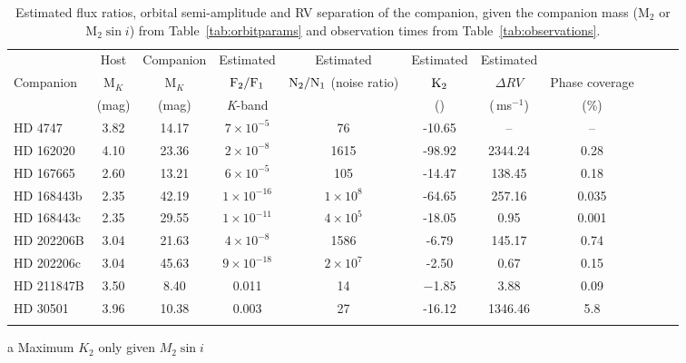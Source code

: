 \begin{table*}
    \small
    \centering
    \begin{threeparttable}[b]
        \caption{Estimated flux ratios, orbital semi-amplitude and RV separation of the companion, given the companion mass (\(\textrm{M}_{2}\) or \(\textrm{M}_{2} \sin{i}\)) from Table~\ref{tab:orbitparams} and observation times from Table~\ref{tab:observations}.}
        \begin{tabular}{l c c c c c c c c c c}%
            \toprule
            & Host & Companion & Estimated & Estimated & Estimated & Estimated & & \\  %
            Companion & M$_{K}$ & M$_{K}$ & \(\rm F_{2}/F_{1} \) & \(\rm N_{2}/N_{1} \) (noise ratio) & \(\rm K_2\) & \(\Delta RV\) & Phase coverage\\
            & (mag) & (mag)& \textit{K}-band & & (\kmps{}) & (\,ms\(^{-1}\)) & (\%)\\
            \midrule
            {HD 4747} & 3.82 & 14.17 & \(7\times10^{-5} \) & 76 & -10.65 & -- & --\\  %
            {HD 162020} & 4.10 & 23.36 & \(2\times10^{-8} \) & 1615 & -98.92\tnote{a} & 2344.24 & 0.28\\  %
            {HD 167665} & 2.60 & 13.21 & \(6\times10^{-5} \) & 105 & -14.47\tnote{a} & 138.45 & 0.18\\  %
            {HD 168443b} & 2.35 & 42.19 & \(1\times10^{-16} \) & \(1\times10^{8} \) & -64.65\tnote{a}& 257.16 & 0.035\\
            {HD 168443c} & 2.35 & 29.55 & \(1\times10^{-11} \) & \(4\times10^{5} \) & -18.05\tnote{a} & 0.95 & 0.001\\  %
            {HD 202206}B & 3.04& 21.63 & \(4\times10^{-8} \) & 1586 & -6.79 & 145.17 & 0.74\\  %
            {HD 202206}c & 3.04& 45.63 & \(9\times10^{-18}\) & \(2\times10^{7} \) & -2.50 & 0.67 & 0.15\\  %
            {HD 211847}B & 3.50 & 8.40 & 0.011 & 14 & $-$1.85 & 3.88 & 0.09\\  %
            {HD 30501} & 3.96 & 10.38 & 0.003 & 27 & -16.12 & 1346.46 & 5.8\\
            \bottomrule& &
            \end{tabular} \label{tab:estimatedparameters}
        \begin{tablenotes}
            \item[a] {Maximum \(K_2\) only given \(M_2 \sin{i}\)}
        \end{tablenotes}
    \end{threeparttable}
\end{table*}
